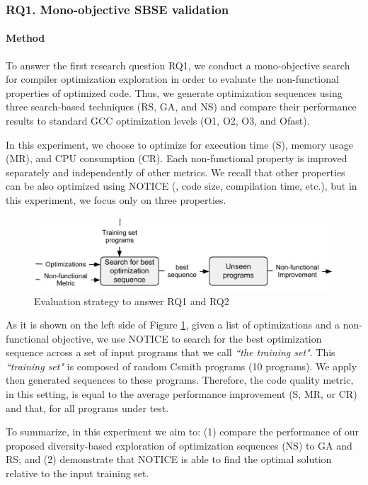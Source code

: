 \subsubsection{RQ1. Mono-objective SBSE validation}
\paragraph{Method}

To answer the first research question RQ1, we conduct a mono-objective search for compiler optimization exploration in order to evaluate the non-functional properties of optimized code. Thus, we generate optimization sequences using three search-based techniques (RS, GA, and NS) and compare their performance results to standard GCC optimization levels (O1, O2, O3, and Ofast). 

In this experiment, we choose to optimize for execution time (S), memory usage (MR), and CPU consumption (CR). Each non-functional property is improved separately and independently of other metrics. We recall that other properties can be also optimized using NOTICE (\eg, code size, compilation time, etc.), but in this experiment, we focus only on three properties.


\begin{figure}[h]
	\centering
	\includegraphics[width=1.\linewidth]{chapitre3/fig/sensitivity.pdf}
	\caption{Evaluation strategy to answer RQ1 and RQ2}
	\label{fig:sensitivity.pdf}
\end{figure}


As it is shown on the left side of Figure \ref{fig:sensitivity.pdf}, given a list of optimizations and a non-functional objective, we use NOTICE to search for the best optimization sequence across a set of input programs that we call \textit{``the training set"}. This \textit{``training set"} is composed of random Csmith programs (10 programs). We apply then generated sequences to these programs. Therefore, the code quality metric, in this setting, is equal to the average performance improvement (S, MR, or CR) and that, for all programs under test. 


To summarize, in this experiment we aim to: (1) compare the performance of our proposed diversity-based exploration of optimization sequences (NS) to GA and RS; and (2) demonstrate that NOTICE is able to find the optimal solution relative to the input training set.

